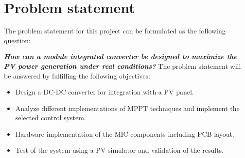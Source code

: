 \section{Problem statement}

The problem statement for this project can be formulated as the following question: 
\newline

\textbf{\textit{\large{How can a module integrated converter be designed to maximize the PV power generation under real conditions?}}}
\newline
\newline
The problem statement will be answered by fulfilling the following objectives: 

\begin{itemize}
	\item Design a DC-DC converter for integration with a PV panel.
	\item Analyze different implementations of MPPT techniques and implement the selected control system. 
	\item Hardware implementation of the MIC components including PCB layout.
	\item Test of the system using a PV simulator and validation of the results. 
\end{itemize}
